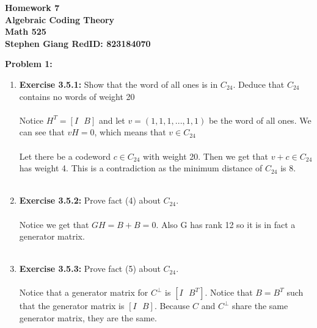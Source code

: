 \documentclass[11pt]{article}
\newcommand{\skipline}{\vspace{\baselineskip}}
\newenvironment{problem}[1]{\textbf{Problem #1: }}{\newpage}
\begin{document}
	
	\begin{center}
		\textbf{Homework 7} \\
		\textbf{Algebraic Coding Theory} \\
		\textbf{Math 525} \\
		\textbf{Stephen Giang RedID: 823184070} \\
		\skipline \skipline
	\end{center}

	\begin{problem}{1}
		\begin{enumerate}[label = (\alph*)]
			\item \textbf{Exercise 3.5.1:} Show that the word of all ones is in $C_{24}$. Deduce that $C_{24}$ contains no words of weight 20
			\\ \\
			Notice $H^T = [I\text{ }B]$ and let $v = (1,1,1,...,1,1)$ be the word of all ones.  We can see that $vH = 0$, which means that $v \in C_{24}$
			\\ \\
			Let there be a codeword $c \in C_{24}$ with weight 20.  Then we get that $v + c \in C_{24}$ has weight 4.  This is a contradiction as the minimum distance of $C_{24}$ is 8.
			\\ \\
			\item \textbf{Exercise 3.5.2:} Prove fact (4) about $C_{24}$.
			\\ \\
			Notice we get that $GH = B + B = 0$.  Also G has rank 12 so it is in fact a generator matrix.
			\\ \\
			\item \textbf{Exercise 3.5.3:} Prove fact (5) about $C_{24}$.
			\\ \\
			Notice that a generator matrix for $C^\perp$ is $[I\text{ }B^T]$.  Notice that $B = B^T$ such that the generator matrix is $[I\text{ }B]$.  Because $C$ and $C^\perp$ share the same generator matrix, they are the same.
		\end{enumerate}
	\end{problem}
\end{document}
